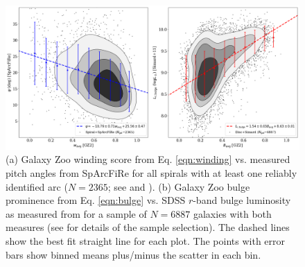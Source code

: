 \documentclass[usenatbib]{mn2e}
\newcommand{\ie}{{\it i.e.}}
\begin{document}
\begin{figure}
\includegraphics[width=140mm]{RossFigure_contours_spread.png}
\caption{(a) Galaxy Zoo winding score from Eq. \ref{eqn:winding} vs. measured pitch angles from SpArcFiRe for all spirals with at least one reliably identified arc ($N=2365$; see \citealt{DavisHayes2014} and \citealt{Hart2017b}). (b) Galaxy Zoo bulge prominence from Eq. \ref{eqn:bulge} vs. SDSS $r$-band bulge luminosity as measured from \citet{Simard2011} for a sample of $N=6887$ galaxies with both measures (see  \citealt{Hart2017b} for details of the sample selection). %
The dashed lines show the best fit straight line for each plot. The points with error bars show binned means plus/minus the scatter in each bin. %
\label{pitch}}
\end{figure}
\end{document}
